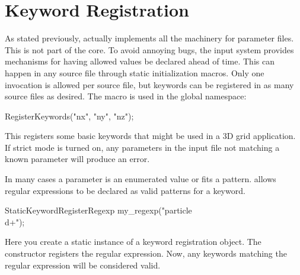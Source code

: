 \section{Keyword Registration}\label{sec:keywords}
As stated previously, \sprockit actually implements all the machinery for parameter files.
This is not part of the \sstmacro core.
To avoid annoying bugs, the \sprockit input system provides mechanisms for having allowed values be declared ahead of time.
This can happen in any source file through static initialization macros.
Only one invocation is allowed per source file,
but keywords can be registered in as many source files as desired.
The macro is used in the global namespace:

\begin{CppCode}
RegisterKeywords("nx", "ny", "nz");
\end{CppCode}
This registers some basic keywords that might be used in a 3D grid application.
If strict mode is turned on, any parameters in the input file not matching a known parameter will produce an error.

In many cases a parameter is an enumerated value or fits a pattern.
\sprockit allows regular expressions to be declared as valid patterns for a keyword.

\begin{CppCode}
StaticKeywordRegisterRegexp my_regexp("particle\\d+");
\end{CppCode}
Here you create a static instance of a keyword registration object.
The constructor registers the regular expression.
Now, any keywords matching the regular expression will be considered valid.


